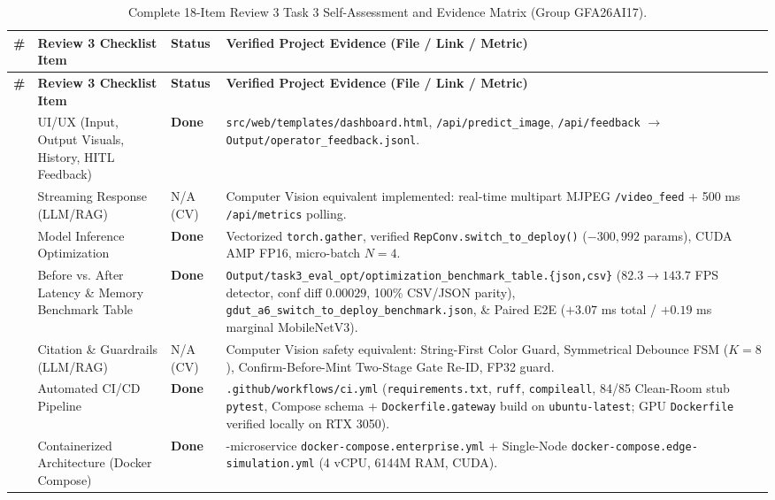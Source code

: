 \begin{longtable}{|>{\centering\arraybackslash}p{0.6cm}|>{\raggedright\arraybackslash}p{3.4cm}|>{\raggedright\arraybackslash}p{1.8cm}|>{\raggedright\arraybackslash}p{7.8cm}|}
\caption{Complete 18-Item Review 3 Task 3 Self-Assessment and Evidence Matrix (Group GFA26AI17).}
\label{tab:app_review3_18} \\
\hline
\rowcolor{slatehdr}
\textbf{\#} & \textbf{Review 3 Checklist Item} & \textbf{Status} & \textbf{Verified Project Evidence (File / Link / Metric)} \\
\hline
\endfirsthead
\hline
\rowcolor{slatehdr}
\textbf{\#} & \textbf{Review 3 Checklist Item} & \textbf{Status} & \textbf{Verified Project Evidence (File / Link / Metric)} \\
\hline
\endhead
\hline
\endfoot
1 & UI/UX (Input, Output Visuals, History, HITL Feedback) & \textbf{Done} & \nolinkurl{src/web/templates/dashboard.html}, \nolinkurl{/api/predict_image}, \texttt{/api/feedback} $\to$ \nolinkurl{Output/operator_feedback.jsonl}. \\ \hline
2 & Streaming Response (LLM/RAG) & N/A (CV) & Computer Vision equivalent implemented: real-time multipart MJPEG \texttt{/video\_feed} + 500 ms \texttt{/api/metrics} polling. \\ \hline
3 & Model Inference Optimization & \textbf{Done} & Vectorized \texttt{torch.gather}, verified \nolinkurl{RepConv.switch_to_deploy()} ($-300,992$ params), CUDA AMP FP16, micro-batch $N=4$. \\ \hline
4 & Before vs. After Latency \& Memory Benchmark Table & \textbf{Done} & \nolinkurl{Output/task3_eval_opt/optimization_benchmark_table.{json,csv}} ($82.3 \to 143.7$ FPS detector, conf diff $0.00029$, 100\% CSV/JSON parity), \nolinkurl{gdut_a6_switch_to_deploy_benchmark.json}, \& Paired E2E ($+3.07$ ms total / $+0.19$ ms marginal MobileNetV3). \\ \hline
5 & Citation \& Guardrails (LLM/RAG) & N/A (CV) & Computer Vision safety equivalent: String-First Color Guard, Symmetrical Debounce FSM ($K=8$), Confirm-Before-Mint Two-Stage Gate Re-ID, FP32 guard. \\ \hline
6 & Automated CI/CD Pipeline & \textbf{Done} & \nolinkurl{.github/workflows/ci.yml} (\texttt{requirements.txt}, \texttt{ruff}, \texttt{compileall}, 84/85 Clean-Room stub \texttt{pytest}, Compose schema + \nolinkurl{Dockerfile.gateway} build on \texttt{ubuntu-latest}; GPU \texttt{Dockerfile} verified locally on RTX 3050). \\ \hline
7 & Containerized Architecture (Docker Compose) & \textbf{Done} & 6-microservice \nolinkurl{docker-compose.enterprise.yml} + Single-Node \nolinkurl{docker-compose.edge-simulation.yml} (4 vCPU, 6144M RAM, CUDA). \\ \hline

\end{longtable}
